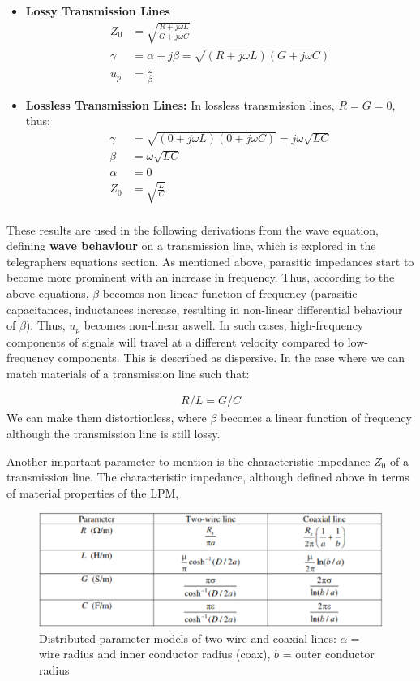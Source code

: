 \documentclass{book}
\begin{document}
\begin{itemize}
	\item \textbf{Lossy Transmission Lines}
\begin{align*}
	Z_0 &= \sqrt{\frac{R+j\omega L}{G + j\omega C}} \\
	\gamma &= \alpha + j\beta = \sqrt{(R+j\omega L)(G+ j \omega C)} \\
	u_p &= \frac{\omega}{\beta}
\end{align*}
	\item \textbf{Lossless Transmission Lines:} In lossless transmission lines, $R=G=0$, thus:
\begin{align*}
	\gamma &= \sqrt{(0+j \omega L) (0 + j\omega C)} = j\omega \sqrt{LC} \\
	\beta &= \omega \sqrt{LC} \\
	\alpha &= 0\\
	Z_0 &= \sqrt{\frac{L}{C}} \\
\end{align*}
\end{itemize}
These results are used in the following derivations from the wave equation, defining \textbf{wave behaviour} on a transmission line, which is explored in the telegraphers equations section. As mentioned above, parasitic impedances start to become more prominent with an increase in frequency. Thus, according to the above equations, $\beta$ becomes non-linear function of frequency (parasitic capacitances, inductances increase, resulting in non-linear differential behaviour of $\beta$). Thus, $u_p$ becomes non-linear aswell. In such cases, high-frequency components of signals will travel at a different velocity compared to low-frequency components. This is described as dispersive. In the case where we can match materials of a transmission line such that:

\begin{align*}
	R/L = G/C
\end{align*} 
We can make them distortionless, where $\beta$ becomes a linear function of frequency although the transmission line is still lossy.  

Another important parameter to mention is the characteristic impedance $Z_0$ of a transmission line. The characteristic impedance, although defined above in terms of material properties of the LPM,  
\begin{figure}[h]
	\centering
	\includegraphics[width=0.5\linewidth]{Screenshots/coax_twowire_dist_parameter_models}
	\caption{Distributed parameter models of two-wire and coaxial lines: $\alpha =$ wire radius and inner conductor radius (coax), $b$ = outer conductor radius}
	\label{fig:coaxtwowiredistparametermodels}
\end{figure}
\end{document}
